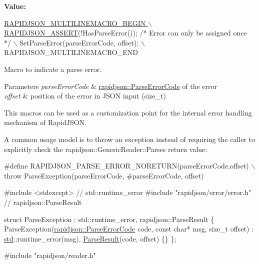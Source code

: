 {\bfseries Value\+:}
\begin{DoxyCode}
\hyperlink{group__RAPIDJSON__CONFIG_gabeba18d612187bad2ac62aed9276d47c}{RAPIDJSON\_MULTILINEMACRO\_BEGIN \(\backslash\)}
\hyperlink{group__RAPIDJSON__CONFIG_gabeba18d612187bad2ac62aed9276d47c}{    RAPIDJSON\_ASSERT}(!HasParseError()); \textcolor{comment}{/* Error can only be assigned once */} \(\backslash\)
    SetParseError(parseErrorCode, offset); \(\backslash\)
    RAPIDJSON\_MULTILINEMACRO\_END
\end{DoxyCode}


Macro to indicate a parse error. 


\begin{DoxyParams}{Parameters}
{\em parse\+Error\+Code} & \hyperlink{group__RAPIDJSON__ERRORS_ga8d4b32dfc45840bca189ade2bbcb6ba7}{rapidjson\+::\+Parse\+Error\+Code} of the error \\
\hline
{\em offset} & position of the error in J\+S\+ON input ({\ttfamily size\+\_\+t})\\
\hline
\end{DoxyParams}
This macros can be used as a customization point for the internal error handling mechanism of Rapid\+J\+S\+ON.

A common usage model is to throw an exception instead of requiring the caller to explicitly check the rapidjson\+::\+Generic\+Reader\+::\+Parse\textquotesingle{}s return value\+:


\begin{DoxyCode}
\textcolor{preprocessor}{#define RAPIDJSON\_PARSE\_ERROR\_NORETURN(parseErrorCode,offset) \(\backslash\)}
\textcolor{preprocessor}{   throw ParseException(parseErrorCode, #parseErrorCode, offset)}

\textcolor{preprocessor}{#include <stdexcept>}               \textcolor{comment}{// std::runtime\_error}
\textcolor{preprocessor}{#include "rapidjson/error/error.h"} \textcolor{comment}{// rapidjson::ParseResult}

\textcolor{keyword}{struct }ParseException : std::runtime\_error, rapidjson::ParseResult \{
  ParseException(\hyperlink{group__RAPIDJSON__ERRORS_ga8d4b32dfc45840bca189ade2bbcb6ba7}{rapidjson::ParseErrorCode} code, \textcolor{keyword}{const} \textcolor{keywordtype}{char}* msg, \textcolor{keywordtype}{size\_t} offset)
    : \hyperlink{namespacestd}{std}::runtime\_error(msg), \hyperlink{structParseResult}{ParseResult}(code, offset) \{\}
\};

\textcolor{preprocessor}{#include "rapidjson/reader.h"}
\end{DoxyCode}


